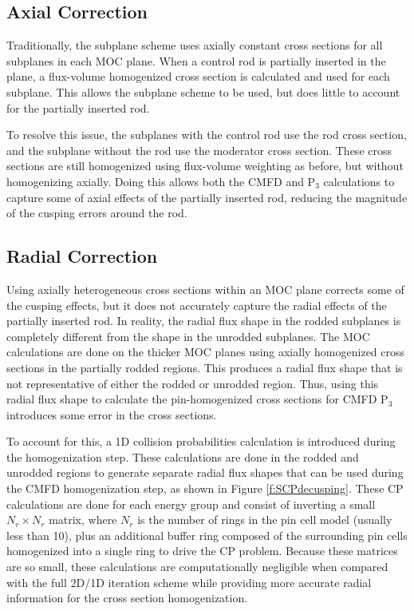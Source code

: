 \subsection{Axial Correction}

Traditionally, the subplane scheme uses axially constant cross sections for all subplanes in each MOC plane.  When a control rod is partially inserted in the plane, a flux-volume homogenized cross section is calculated and used for each subplane.  This allows the subplane scheme to be used, but does little to account for the partially inserted rod.

To resolve this issue, the subplanes with the control rod use the rod cross section, and the subplane without the rod use the moderator cross section.  These cross sections are still homogenized using flux-volume weighting as before, but without homogenizing axially.  Doing this allows both the CMFD and P$_3$ calculations to capture some of axial effects of the partially inserted rod, reducing the magnitude of the cusping errors around the rod.

\subsection{Radial Correction}

Using axially heterogeneous cross sections within an MOC plane corrects some of the cusping effects, but it does not accurately capture the radial effects of the partially inserted rod.  In reality, the radial flux shape in the rodded subplanes is completely different from the shape in the unrodded subplanes.  The MOC calculations are done on the thicker MOC planes using axially homogenized cross sections in the partially rodded regions.  This produces a radial flux shape that is not representative of either the rodded or unrodded region.  Thus, using this radial flux shape to calculate the pin-homogenized cross sections for CMFD P$_3$ introduces some error in the cross sections.

To account for this, a 1D collision probabilities calculation is introduced during the homogenization step.  These calculations are done in the rodded and unrodded regions to generate separate radial flux shapes that can be used during the CMFD homogenization step, as shown in Figure \ref{f:SCPdecusping}.  These CP calculations are done for each energy group and consist of inverting a small $N_r \times N_r$ matrix, where $N_r$ is the number of rings in the pin cell model (usually less than 10), plus an additional buffer ring composed of the surrounding pin cells homogenized into a single ring to drive the CP problem.  Because these matrices are so small, these calculations are computationally negligible when compared with the full 2D/1D iteration scheme while providing more accurate radial information for the cross section homogenization.

